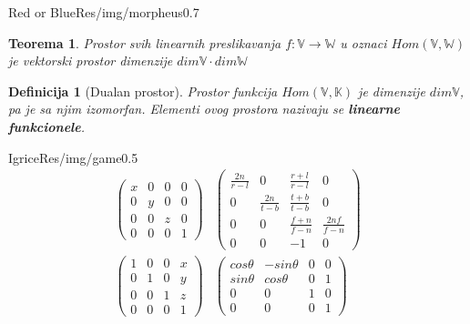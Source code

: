 \documentclass{beamer}
\newtheorem*{teo}{Teorema}
\newtheorem*{df}{Definicija}
\begin{document}
    \begin{framebg}{Red or Blue}{Res/img/morpheus}{0.7}
        \pause
        \begin{teo}
            Prostor svih linearnih preslikavanja $f : \mathbb V \to \mathbb W$ u oznaci
            $Hom(\mathbb V, \mathbb W)$ je vektorski
            prostor dimenzije $dim \mathbb V \cdot dim \mathbb W$
        \end{teo}
        \pause
        \begin{df}[Dualan prostor]
            Prostor funkcija $Hom(\mathbb V, \mathbb K)$ je dimenzije $dim \mathbb V$,
            pa je sa njim izomorfan. Elementi ovog prostora nazivaju se \textbf{linearne funkcionele}.
        \end{df}
    \end{framebg}
    \begin{framebg}{Igrice}{Res/img/game}{0.5}
        \begin{align*}
            \begin{pmatrix}
                x & 0 & 0 & 0 \\
                0 & y & 0 & 0 \\
                0 & 0 & z & 0 \\
                0 & 0 & 0 & 1
            \end{pmatrix} &
            \begin{pmatrix}
                \frac{2n}{r-l} & 0 & \frac{r+l}{r-l} & 0 \\
                0 & \frac{2n}{t-b} & \frac{t+b}{t-b} & 0 \\
                0 & 0 & \frac{f+n}{f-n} & \frac{2nf}{f-n} \\
                0 & 0 & -1 & 0
            \end{pmatrix} \\
            \begin{pmatrix}
                1 & 0 & 0 & x \\
                0 & 1 & 0 & y \\
                0 & 0 & 1 & z \\
                0 & 0 & 0 & 1
            \end{pmatrix} &
            \begin{pmatrix}
                cos \theta & -sin \theta & 0 & 0 \\
                sin \theta &  cos \theta & 0 & 1 \\
                0 & 0 & 1 & 0 \\
                0 & 0 & 0 & 1
            \end{pmatrix}
        \end{align*}
    \end{framebg}
\end{document}
